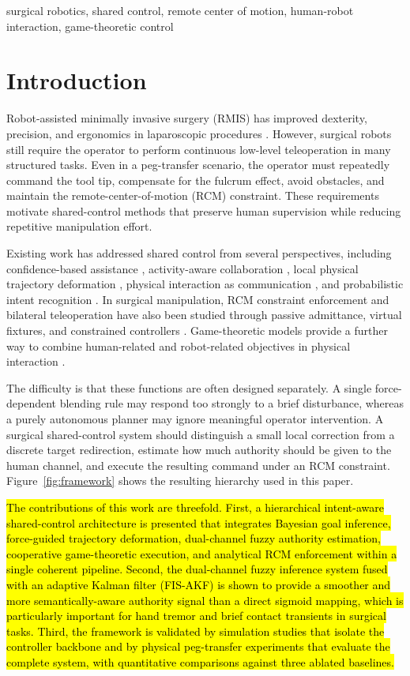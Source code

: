 \documentclass[conference]{IEEEtran}
\begin{document}
\begin{IEEEkeywords}
surgical robotics, shared control, remote center of motion, human-robot interaction, game-theoretic control
\end{IEEEkeywords}

\section{Introduction}
Robot-assisted minimally invasive surgery (RMIS) has improved dexterity, precision, and ergonomics in laparoscopic procedures \cite{haidegger2022,attanasio2021}. However, surgical robots still require the operator to perform continuous low-level teleoperation in many structured tasks. Even in a peg-transfer scenario, the operator must repeatedly command the tool tip, compensate for the fulcrum effect, avoid obstacles, and maintain the remote-center-of-motion (RCM) constraint. These requirements motivate shared-control methods that preserve human supervision while reducing repetitive manipulation effort.

Existing work has addressed shared control from several perspectives, including confidence-based assistance \cite{saeidi2018}, activity-aware collaboration \cite{su2022}, local physical trajectory deformation \cite{losey2018}, physical interaction as communication \cite{losey2022}, and probabilistic intent recognition \cite{jain2019}. In surgical manipulation, RCM constraint enforcement and bilateral teleoperation have also been studied through passive admittance, virtual fixtures, and constrained controllers \cite{kastritsi2022,su2020}. Game-theoretic models provide a further way to combine human-related and robot-related objectives in physical interaction \cite{li2019,franceschi2024}.

The difficulty is that these functions are often designed separately. A single force-dependent blending rule may respond too strongly to a brief disturbance, whereas a purely autonomous planner may ignore meaningful operator intervention. A surgical shared-control system should distinguish a small local correction from a discrete target redirection, estimate how much authority should be given to the human channel, and execute the resulting command under an RCM constraint. Figure~\ref{fig:framework} shows the resulting hierarchy used in this paper.

\hl{The contributions of this work are threefold. First, a hierarchical intent-aware shared-control architecture is presented that integrates Bayesian goal inference, force-guided trajectory deformation, dual-channel fuzzy authority estimation, cooperative game-theoretic execution, and analytical RCM enforcement within a single coherent pipeline. Second, the dual-channel fuzzy inference system fused with an adaptive Kalman filter (FIS-AKF) is shown to provide a smoother and more semantically-aware authority signal than a direct sigmoid mapping, which is particularly important for hand tremor and brief contact transients in surgical tasks. Third, the framework is validated by simulation studies that isolate the controller backbone and by physical peg-transfer experiments that evaluate the complete system, with quantitative comparisons against three ablated baselines.}
\end{document}
